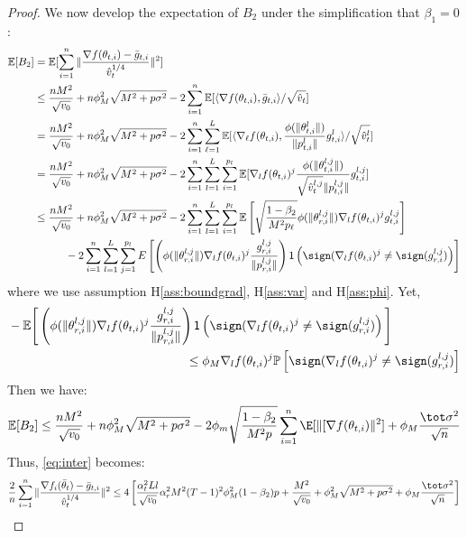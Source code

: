 \documentclass[11pt]{article}
\begin{document}
\begin{proof}
We now develop the expectation of $B_2$ under the simplification that $\beta_1 = 0$:
\begin{align}\notag
    \mathbb E[B_2]&=\mathbb E[\sum_{i=1}^n\Vert \frac{\nabla f(\theta_{t,i})-\bar g_{t,i}}{\hat v_t^{1/4}} \Vert^2] \\\notag
    &\leq \frac{nM^2}{\sqrt{v_0}}+n\phi_M^2\sqrt{M^2+p\sigma^2}-2\sum_{i=1}^n\mathbb E[\langle \nabla f(\theta_{t,i}),\bar g_{t,i} \rangle/\sqrt{\hat v_t}]\\\notag
    &=\frac{nM^2}{\sqrt{v_0}}+n\phi_M^2\sqrt{M^2+p\sigma^2}-2\sum_{i=1}^n \sum_{\ell=1}^L \mathbb E[\langle \nabla_\ell f(\theta_{t,i}),\frac{\phi(\|\theta_{t,i}^l \|)}{\| p_{t,i}^l \|}g_{t,i}^l \rangle/\sqrt{\hat v_t^l}]\\\notag
    &=\frac{nM^2}{\sqrt{v_0}}+n\phi_M^2\sqrt{M^2+p\sigma^2}-2\sum_{i=1}^n \sum_{l=1}^L\sum_{i=1}^{p_l} \mathbb E[\nabla_l f(\theta_{t,i})^j\frac{\phi(\|\theta_{t,i}^{l,j} \|)}{\sqrt{\hat v_t^{l,j}}\| p_{t,i}^{l,j} \|}g_{t,i}^{l,j} ]\\\notag
    & \leq \frac{nM^2}{\sqrt{v_0}}+n\phi_M^2\sqrt{M^2+p\sigma^2}-2\sum_{i=1}^n \sum_{l=1}^L\sum_{i=1}^{p_l} \mathbb E \left[ \sqrt{\frac{1-\beta_2}{M^2 p_\ell}}  \phi(\|\theta_{r,i}^{l,j}\|)  \nabla_l f(\theta_{t,i})^j  g_{t,i}^{l,j}\right]\\\notag
    &\hspace{0.4in} -2 \sum_{i = 1}^n \sum_{l=1}^L\sum_{j=1}^{p_l}  E \left[  \left( \phi(\|\theta_{r,i}^{l,j}\|)   \nabla_l f(\theta_{t,i})^j   \frac{g_{r,i}^{l,j}}{ \|p_{r,i}^{l,j}\|}\right)\mathsf{1}\left( \sign(  \nabla_l f(\theta_{t,i})^j \neq  \sign( g_{r,i}^{l,j}) \right)\right]
\end{align}
where we use assumption H\ref{ass:boundgrad}, H\ref{ass:var} and H\ref{ass:phi}. 
Yet,
\begin{align*}
&- \mathbb E \Bigg[  \left( \phi(\|\theta_{r,i}^{l,j}\|)   \nabla_l f(\theta_{t,i})^j   \frac{g_{r,i}^{l,j}}{ \|p_{r,i}^{l,j}\|}\right)\mathsf{1}\left( \sign(  \nabla_l f(\theta_{t,i})^j
\neq  \sign( g_{r,i}^{l,j}) \right)\Bigg] \\
&\hspace{2in} \leq  \phi_M \nabla_l f(\theta_{t,i})^j   \mathbb{P}\left[  \sign(  \nabla_l f(\theta_{t,i})^j \neq  \sign( g_{r,i}^{l,j}) \right]
\end{align*}
Then we have:
\begin{align}\notag
    \mathbb E[B_2]\leq  \frac{nM^2}{\sqrt{v_0}}+n\phi_M^2\sqrt{M^2+p\sigma^2}-2 \phi_m \sqrt{\frac{1-\beta_2}{M^2 p}} \sum_{i=1}^n \E[\| [\nabla f(\theta_{t,i}) \|^2] + \phi_M \frac{\tot \sigma^2}{\sqrt{n}}
\end{align}
Thus, \eqref{eq:inter} becomes:
\begin{align}\notag
    \frac{2}{n}\sum_{i=1}^n\Vert \frac{\nabla f_i(\bar\theta_t)-\bar g_{t,i}}{\hat v_t^{1/4}} \Vert^2 \leq 4 \left[ \frac{\alpha_t^2 Ll}{\sqrt{v_0}} \alpha_r^2 M^2 (T-1)^2 \phi_M^2 (1-\beta_2)p + \frac{M^2}{\sqrt{v_0}}+\phi_M^2\sqrt{M^2+p\sigma^2} + \phi_M \frac{\tot \sigma^2}{\sqrt{n}}\right]
\end{align}


\end{proof}
\end{document}
